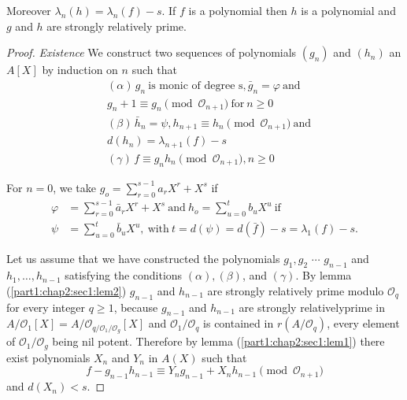 Moreover $\lambda_n (h) = \lambda_n (f)-s$. If $f$ is a polynomial
then $h$ is a polynomial and $g$ and $h$ are strongly relatively
prime.  

\begin{proof}%
  {\em Existence} We construct two sequences of polynomials $(g_n)$
  and $(h_n)$ an $A[X]$ by induction on $n$ such that 
  \begin{align*}
    & (\alpha)\, g_n ~\text{is monic of degree s}, \bar{g}_n =\varphi
    ~\text{and}\\ 
    & g_n +1 \equiv g_n \pmod {\mathscr{O}_{n+1}} ~\text{for}~ n \geq 0\\
    & (\beta)\, \bar{h}_n = \psi,  h_{n+1} \equiv h_n \pmod
    {\mathscr{O}_{n+1}}  ~\text{and}\\ 
    & d(h_n)= \lambda_{n+1}(f) -s\\
    & (\gamma)\, f \equiv g_n h_n \pmod {\mathscr{O}_{n+1}}, n\geq 0
  \end{align*}

  For $n=0$, we take $g_o = \sum\limits_{r=0}^{s-1} a_r X^r + X^s$ if 
  \begin{align*}
     \varphi & = \sum_{r=0}^{s-1} \bar{a}_r X^r+ X^s ~\text{and}~ h_o =
    \sum_{u=0}^{t} b_u X^u ~\text{if}\\ 
     \psi &=  \sum_{u=0}^{t} \bar{b}_u X^u, ~\text{with}~ t=d (\psi
    )=d(\bar{f})- s =\lambda _1 (f)-s.  
  \end{align*}
  
  Let us assume that we have constructed the polynomials $g_1, g_2$
   $\cdots$ $g_{n-1}$ and $h_1, \ldots, h_{n-1}$ satisfying the conditions
  $(\alpha), (\beta)$, and $(\gamma)$. By lemma
  (\ref{part1:chap2:sec1:lem2}) $g_{n-1}$ and 
  $h_{n-1}$ are strongly relatively prime modulo $\mathscr{O}_q$ for
  every integer $q \geq 1$, because $g_{n-1}$ and $h_{n-1}$ are strongly
  relatively\pageoriginale prime in $A/ \mathscr{O}_1 [X]=A /
  \mathscr{O}_{q \bigg / 
    \mathscr{O}_1 / \mathscr{O}_g} [X]$ and $\mathscr{O}_1 /
  \mathscr{O}_q$ is contained in $ r(A/ \mathscr{O}_q)$, every element of
  $\mathscr{O}_1/ \mathscr{O}_g$ being nil potent. Therefore by lemma
  (\ref{part1:chap2:sec1:lem1}) there exist polynomials $X_n$ and
  $Y_n$ in $A(X)$ such that  
  $$
  f- g_{n-1}h_{n-1}\equiv Y_n g_{n-1}+ X_n h_{n-1} \pmod {\mathscr{O}_{n+1}}
  $$
  and $d(X_n)< s$.
\end{proof}

